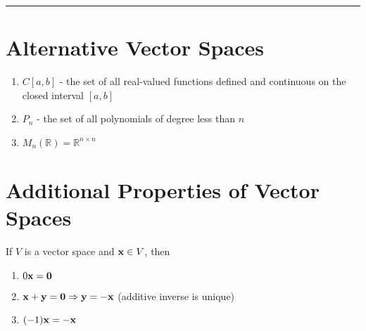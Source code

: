 	 
\rule[0.01in]{\textwidth}{0.0025in}


 
 
 
 
 
 
 
 \section*{Alternative Vector Spaces}
\begin{enumerate}
	\item $C[a,b]$ - the set of all real-valued functions defined and continuous on the closed interval $[a,b]$
	\item $P_n$ - the set of all polynomials of degree less than $n$
	
	\item $M_n(\mathbb{R}) = \mathbb{R}^{n \times n}$
\end{enumerate}



\section*{Additional Properties of Vector Spaces}

\begin{theorem}
If $V$ is a vector space and ${\bf x} \in V$, then
\begin{enumerate}
	\item $0 {\bf x} = {\bf 0}$
	\item ${\bf x} + {\bf y} = {\bf 0} \Rightarrow  {\bf y} = - {\bf x}$ (additive inverse is unique)
	\item $(-1) {\bf x} = - {\bf x}$
\end{enumerate}




	
\end{theorem}


